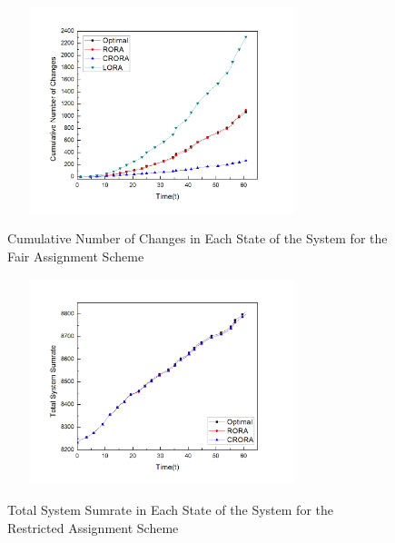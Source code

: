 \documentclass[times]{dacauth}
\begin{document}
\begin{figure}[t]
	{ %
		\setlength{\fboxsep}{1.5pt}%
		\setlength{\fboxrule}{1.5pt}%
		\centering
		\includegraphics[width=90mm,height=60mm]{Graph/nocFairjournal.jpg}
		\vspace{-0.2cm}
		\caption{Cumulative Number of Changes in Each State of the System for the Fair Assignment Scheme}
		\vspace{-.5cm}
		\label{fig:noc_f}
		
	}
\end{figure}


\begin{figure}[t]
	{ %
		\setlength{\fboxsep}{1.5pt}%
		\setlength{\fboxrule}{1.5pt}%
		\centering
		\includegraphics[width=90mm,height=60mm]{Graph/sumrateresjournal.jpg}
		\vspace{-0.2cm}
		\caption{Total System Sumrate in Each State of the System for the Restricted Assignment Scheme}
		\vspace{-.5cm}
		\label{fig:sum_r}
	}
\end{figure}
\end{document}
